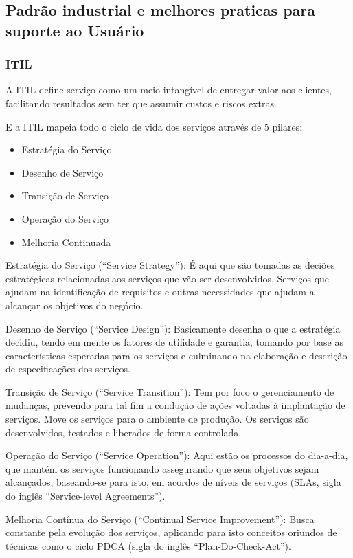 \documentclass[11pt,a4paper]{article}
\begin{document}
\subsection{Padrão industrial  e melhores praticas para suporte ao Usuário}
\subsubsection{ITIL}
A ITIL define serviço como um meio intangível de entregar valor aos clientes,
facilitando resultados sem ter que assumir custos e riscos extras.

E a ITIL mapeia todo o ciclo de vida dos serviços através de 5 pilares:
\begin{itemize}[noitemsep]
  \item Estratégia do Serviço
  \item Desenho de Serviço
  \item Transição de Serviço
  \item Operação do Serviço
  \item Melhoria Continuada
\end{itemize}

Estratégia do Serviço (“Service Strategy”): É aqui que são tomadas as deciões estratégicas relacionadas aos serviços que vão ser desenvolvidos. Serviços que ajudam na identificação de requisitos e outras necessidades que ajudam a alcançar os objetivos do negócio.

Desenho de Serviço (“Service Design”): Basicamente desenha o que a estratégia decidiu, tendo em mente os fatores de utilidade e garantia, tomando por base as características esperadas para os serviços e culminando na elaboração e descrição de especificações dos serviços.

Transição de Serviço (“Service Transition”): Tem por foco o gerenciamento de mudanças, prevendo para tal fim a condução de ações voltadas à implantação de serviços. Move os serviços para o ambiente de produção. Os serviços são desenvolvidos, testados e liberados de forma controlada.

Operação do Serviço (“Service Operation”): Aqui estão os processos do dia-a-dia, que mantém os serviços funcionando assegurando que seus objetivos sejam alcançados, baseando-se para isto, em acordos de níveis de serviços (SLAs, sigla do inglês “Service-level Agreements”).

Melhoria Contínua do Serviço (“Continual Service Improvement”): Busca constante pela evolução dos serviços, aplicando para isto conceitos oriundos de técnicas como o ciclo PDCA (sigla do inglês “Plan-Do-Check-Act”).
\end{document}
